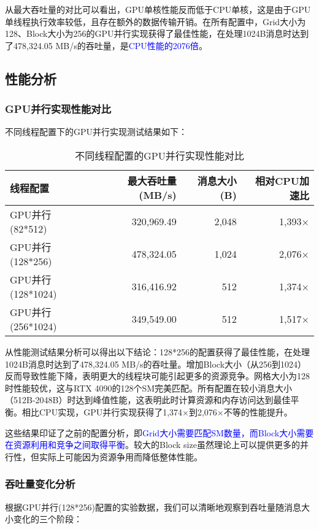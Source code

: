 \documentclass[report]{../../custom}
\begin{document}
从最大吞吐量的对比可以看出，GPU单核性能反而低于CPU单核，这是由于GPU单线程执行效率较低，且存在额外的数据传输开销。在所有配置中，Grid大小为128、Block大小为256的GPU并行实现获得了最佳性能，在处理1024B消息时达到了478,324.05 MB/s的吞吐量，是\textcolor{blue}{CPU性能的2076倍}。

\subsection{性能分析}

\subsubsection{GPU并行实现性能对比}

不同线程配置下的GPU并行实现测试结果如下：

\begin{table}[htbp]
\centering
\caption{不同线程配置的GPU并行实现性能对比}
\begin{tabular}{|l|r|r|r|}
\hline
线程配置 & 最大吞吐量 (MB/s) & 消息大小 (B) & 相对CPU加速比 \\
\hline
GPU并行(82*512) & 320,969.49 & 2,048 & 1,393× \\
GPU并行(128*256) & 478,324.05 & 1,024 & 2,076× \\
GPU并行(128*1024) & 316,416.92 & 512 & 1,374× \\
GPU并行(256*1024) & 349,549.00 & 512 & 1,517× \\
\hline
\end{tabular}
\end{table}
从性能测试结果分析可以得出以下结论：128*256的配置获得了最佳性能，在处理1024B消息时达到了478,324.05 MB/s的吞吐量。增加Block大小（从256到1024）反而导致性能下降，表明更大的线程块可能引起更多的资源竞争。网格大小为128时性能较优，这与RTX 4090的128个SM完美匹配。所有配置在较小消息大小（512B-2048B）时达到峰值性能，这表明此时计算资源和内存访问达到最佳平衡。相比CPU实现，GPU并行实现获得了1,374×到2,076×不等的性能提升。

这些结果印证了之前的配置分析，即\textcolor{blue}{Grid大小需要匹配SM数量，而Block大小需要在资源利用和竞争之间取得平衡}。较大的Block size虽然理论上可以提供更多的并行性，但实际上可能因为资源争用而降低整体性能。

\subsubsection{吞吐量变化分析}

根据GPU并行(128*256)配置的实验数据，我们可以清晰地观察到吞吐量随消息大小变化的三个阶段：
\end{document}
